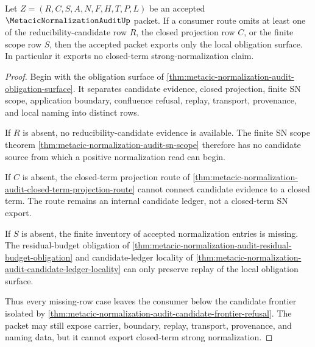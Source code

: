 \begin{theorem}
\label{thm:metacic-normalization-audit-candidate-frontier-refusal-tightening}
Let $Z=(R,C,S,A,N,F,H,T,P,L)$ be an accepted $\MetacicNormalizationAuditUp$ packet. If a consumer route omits at least one of the reducibility-candidate row $R$, the closed projection row $C$, or the finite scope row $S$, then the accepted packet exports only the local obligation surface. In particular it exports no closed-term strong-normalization claim.
\end{theorem}
\begin{proof}
Begin with the obligation surface of \autoref{thm:metacic-normalization-audit-obligation-surface}. It separates candidate evidence, closed projection, finite SN scope, application boundary, confluence refusal, replay, transport, provenance, and local naming into distinct rows.

If $R$ is absent, no reducibility-candidate evidence is available. The finite SN scope theorem \autoref{thm:metacic-normalization-audit-sn-scope} therefore has no candidate source from which a positive normalization read can begin.

If $C$ is absent, the closed-term projection route of \autoref{thm:metacic-normalization-audit-closed-term-projection-route} cannot connect candidate evidence to a closed term. The route remains an internal candidate ledger, not a closed-term SN export.

If $S$ is absent, the finite inventory of accepted normalization entries is missing. The residual-budget obligation of \autoref{thm:metacic-normalization-audit-residual-budget-obligation} and candidate-ledger locality of \autoref{thm:metacic-normalization-audit-candidate-ledger-locality} can only preserve replay of the local obligation surface.

Thus every missing-row case leaves the consumer below the candidate frontier isolated by \autoref{thm:metacic-normalization-audit-candidate-frontier-refusal}. The packet may still expose carrier, boundary, replay, transport, provenance, and naming data, but it cannot export closed-term strong normalization.
\end{proof}

